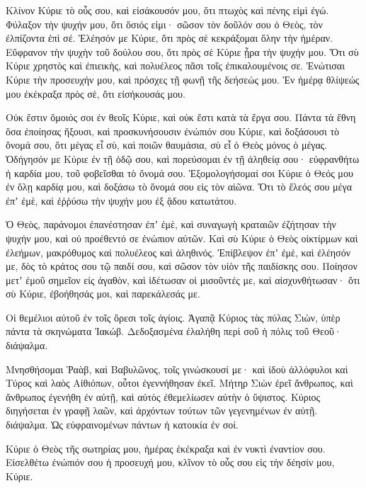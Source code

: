 \begin{spacing}{1.1}
\begin{multicols}{2}
Κλίνον Κύριε τὸ οὖς σου, καὶ εἰσάκουσόν μου, ὅτι πτωχὸς καὶ πένης εἰμὶ ἐγώ.
Φύλαξον τὴν ψυχήν μου, ὅτι ὅσιός εἰμι· σῶσον τὸν δοῦλόν σου ὁ Θεὸς, τὸν ἐλπίζοντα ἐπὶ σέ.
Ἐλέησόν με Κύριε, ὅτι πρὸς σὲ κεκράξομαι ὅλην τὴν ἡμέραν.
Εὔφρανον τὴν ψυχὴν τοῦ δούλου σου, ὅτι πρὸς σὲ Κύριε ᾖρα τὴν ψυχήν μου.
Ὅτι σὺ Κύριε χρηστὸς καὶ ἐπιεικὴς, καὶ πολυέλεος πᾶσι τοῖς ἐπικαλουμένοις σε.
Ἐνώτισαι Κύριε τὴν προσευχήν μου, καὶ πρόσχες τῇ φωνῇ τῆς δεήσεώς μου.
Ἐν ἡμέρᾳ θλίψεώς μου ἐκέκραξα πρὸς σὲ, ὅτι εἰσήκουσάς μου.

Οὐκ ἔστιν ὅμοιός σοι ἐν θεοῖς Κύριε, καὶ οὐκ ἔστι κατὰ τὰ ἔργα σου.
Πάντα τὰ ἔθνη ὅσα ἐποίησας ἥξουσι, καὶ προσκυνήσουσιν ἐνώπιόν σου Κύριε, καὶ δοξάσουσι τὸ ὄνομά σου,
ὅτι μέγας εἶ σὺ, καὶ ποιῶν θαυμάσια, σὺ εἶ ὁ Θεὸς μόνος ὁ μέγας.
Ὁδήγησόν με Κύριε ἐν τῇ ὁδῷ σου, καὶ πορεύσομαι ἐν τῇ ἀληθείᾳ σου· εὐφρανθήτω ἡ καρδία μου, τοῦ φοβεῖσθαι τὸ ὄνομά σου.
Ἐξομολογήσομαί σοι Κύριε ὁ Θεός μου ἐν ὅλῃ καρδίᾳ μου, καὶ δοξάσω τὸ ὄνομά σου εἰς τὸν αἰῶνα.
Ὅτι τὸ ἔλεός σου μέγα ἐπʼ ἐμὲ, καὶ ἐῤῥύσω τὴν ψυχήν μου ἐξ ᾅδου κατωτάτου.

Ὁ Θεὸς, παράνομοι ἐπανέστησαν ἐπʼ ἐμὲ, καὶ συναγωγὴ κραταιῶν ἐζήτησαν τὴν ψυχήν μου, καὶ οὐ προέθεντό σε ἐνώπιον αὐτῶν.
Καὶ σὺ Κύριε ὁ Θεὸς οἰκτίρμων καὶ ἐλεήμων, μακρόθυμος καὶ πολυέλεος καὶ ἀληθινός.
Ἐπίβλεψον ἐπʼ ἐμὲ, καὶ ἐλέησόν με, δὸς τὸ κράτος σου τῷ παιδί σου, καὶ σῶσον τὸν υἱὸν τῆς παιδίσκης σου.
Ποίησον μετʼ ἐμοῦ σημεῖον εἰς ἀγαθὸν, καὶ ἰδέτωσαν οἱ μισοῦντές με, καὶ αἰσχυνθήτωσαν· ὅτι σὺ Κύριε, ἐβοήθησάς μοι, καὶ παρεκάλεσάς με.

Οἱ θεμέλιοι αὐτοῦ ἐν τοῖς ὄρεσι τοῖς ἁγίοις.
Ἀγαπᾷ Κύριος τὰς πύλας Σιὼν, ὑπὲρ πάντα τὰ σκηνώματα Ἰακώβ.
Δεδοξασμένα ἐλαλήθη περὶ σοῦ ἡ πόλις τοῦ Θεοῦ· διάψαλμα.

Μνησθήσομαι Ῥαὰβ, καὶ Βαβυλῶνος, τοῖς γινώσκουσί με· καὶ ἰδοὺ ἀλλόφυλοι καὶ Τύρος καὶ λαὸς Αἰθιόπων, οὗτοι ἐγεννήθησαν ἐκεῖ.
Μήτηρ Σιὼν ἐρεῖ ἄνθρωπος, καὶ ἄνθρωπος ἐγενήθη ἐν αὐτῇ, καὶ αὐτὸς ἐθεμελίωσεν αὐτὴν ὁ ὕψιστος.
Κύριος διηγήσεται ἐν γραφῇ λαῶν, καὶ ἀρχόντων τούτων τῶν γεγενημένων ἐν αὐτῇ. διάψαλμα.
Ὡς εὐφραινομένων πάντων ἡ κατοικία ἐν σοί.

Κύριε ὁ Θεὸς τῆς σωτηρίας μου, ἡμέρας ἐκέκραξα καὶ ἐν νυκτὶ ἐναντίον σου.
Εἰσελθέτω ἐνώπιόν σου ἡ προσευχή μου, κλῖνον τὸ οὖς σου εἰς τὴν δέησίν μου, Κύριε.


\end{multicols}
\end{spacing}
